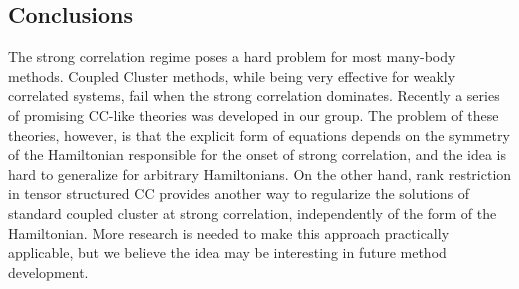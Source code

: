 \subsection{Conclusions}
The strong correlation regime poses a hard problem for most many-body methods. 
Coupled Cluster methods, while being very effective for weakly correlated 
systems, fail when the strong correlation dominates. Recently a series of 
promising CC-like theories was developed in our 
group.\cite{degroote2016polynomial, gomez2017attenuated, 
qiu2017projected2, hermes2017combining} 
The problem of these theories, however, is that the explicit form of equations 
depends on the symmetry of the Hamiltonian responsible for the onset of strong 
correlation, and the idea is hard to generalize for arbitrary Hamiltonians. On 
the other hand, rank restriction in tensor structured CC provides another way to 
regularize the solutions of standard coupled cluster at strong correlation, 
independently of the form of the Hamiltonian. More research is needed to make 
this approach practically applicable, but we believe the idea may be 
interesting in future method development.